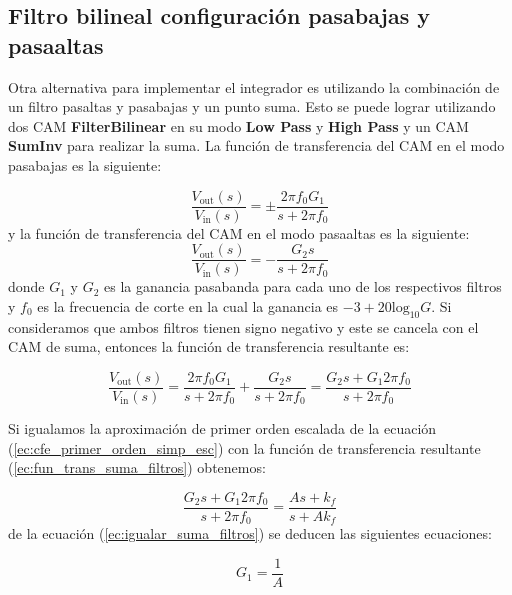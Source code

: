 		\subsection{Filtro bilineal configuración pasabajas y pasaaltas}

	Otra alternativa para implementar el integrador es utilizando la combinación de un filtro pasaltas y pasabajas y un punto suma. Esto se puede lograr utilizando dos CAM \textbf{FilterBilinear} en su modo \textbf{Low Pass} y \textbf{High Pass} y un CAM \textbf{SumInv} para realizar la suma. La función de transferencia del CAM en el modo pasabajas es la siguiente:
	
	\begin{equation}
		\frac{V_{\mathrm{out}} (s)}{V_{\mathrm{in}}(s)} =  \pm \frac{2 \pi f_{0} G_{1}}{s + 2 \pi f_{0}}
		\label{ec:CAM_bilinear_pasabajas}
	\end{equation}
	y la función de transferencia del CAM en el modo pasaaltas es la siguiente:
	\begin{equation}
		\frac{V_{\mathrm{out}} (s)}{V_{\mathrm{in}}(s)} =  - \frac{ G_{2} s}{s + 2 \pi f_{0}}
		\label{ec:CAM_bilinear_pasaaltas}
	\end{equation}
	donde $G_{1}$ y $G_{2}$ es la ganancia pasabanda para cada uno de los respectivos filtros y $f_{0}$ es la frecuencia de corte en la cual la ganancia es $-3 + 20 \mathrm{log}_{10}G$. Si consideramos que ambos filtros tienen signo negativo y este se cancela con el CAM de suma, entonces la  función de transferencia resultante es:
	
	\begin{equation}
		\frac{V_{\mathrm{out}} (s)}{V_{\mathrm{in}}(s)} = \frac{2 \pi f_{0} G_{1}}{s + 2 \pi f_{0}} + \frac{ G_{2} s}{s + 2 \pi f_{0}} = \frac{G_{2}s + G_{1}2 \pi f_{0}}{s + 2 \pi f_{0}}
		\label{ec:fun_trans_suma_filtros}
	\end{equation}

	Si igualamos la aproximación de primer orden escalada de la ecuación (\ref{ec:cfe_primer_orden_simp_esc}) con la función de transferencia resultante (\ref{ec:fun_trans_suma_filtros}) obtenemos:
	
	\begin{equation}
		\frac{G_{2}s + G_{1}2 \pi f_{0}}{s + 2 \pi f_{0}} = \frac{As + k_{f}}{s + Ak_{f}}
		\label{ec:igualar_suma_filtros}
	\end{equation}
	de la ecuación (\ref{ec:igualar_suma_filtros}) se deducen las siguientes ecuaciones:
	
	\begin{equation}
		G_{1} = \frac{1}{A}
	\end{equation}	
	
